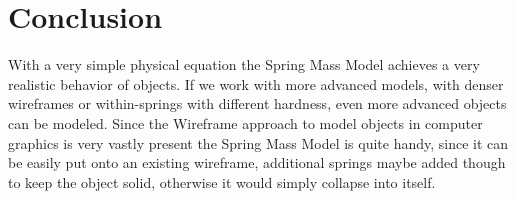 \documentclass[11pt]{article}
\begin{document}
\section{Conclusion}
With a very simple physical equation the Spring Mass Model achieves a very realistic behavior of objects. If we work with more advanced models, with denser wireframes or within-springs with different hardness, even more advanced objects can be modeled. Since the Wireframe approach to model objects in computer graphics is very vastly present the Spring Mass Model is quite handy, since it can be easily put onto an existing wireframe, additional springs maybe added though to keep the object solid, otherwise it would simply collapse into itself.
%


%
%
\newpage
\nocite{hill}
\nocite{rogersadams}
\nocite{dam}
\nocite{PBDM}
\nocite{baker}
\nocite{bakerGL}
\nocite{IASDO}
\nocite{LSCS}
\nocite{DCMSM}
\nocite{gama}
\nocite{wiki}
\nocite{hair}



%
%
\end{document}
